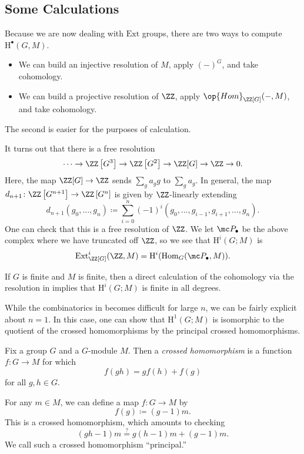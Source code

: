 \documentclass[../notes.tex]{subfiles}
\begin{document}
\subsection{Some Calculations}
Because we are now dealing with $\mathrm{Ext}$ groups, there are two ways to compute $\mathrm H^\bullet(G,M)$.
\begin{itemize}
	\item We can build an injective resolution of $M$, apply $(-)^G$, and take cohomology.
	\item We can build a projective resolution of $\ZZ$, apply $\op{Hom}_{\ZZ[G]}(-,M)$, and take cohomology.
\end{itemize}
The second is easier for the purposes of calculation.
\begin{example} \label{ex:compute-group-cohom}
	It turns out that there is a free resolution
	\[\cdots\to\ZZ\left[G^3\right]\to\ZZ\left[G^2\right]\to\ZZ[G]\to\ZZ\to0.\]
	Here, the map $\ZZ[G]\to\ZZ$ sends $\sum_ga_gg$ to $\sum_ga_g$. In general, the map $d_{n+1}\colon\ZZ\left[G^{n+1}\right]\to\ZZ\left[G^n\right]$ is given by $\ZZ$-linearly extending
	\[d_{n+1}(g_0,\ldots,g_n)\coloneqq\sum_{i=0}^n(-1)^i(g_0,\ldots,g_{i-1},g_{i+1},\ldots,g_n).\]
	One can check that this is a free resolution of $\ZZ$. We let $\mc P_\bullet$ be the above complex where we have truncated off $\ZZ$, so we see that $\mathrm H^i(G;M)$ is
	\[\mathrm{Ext}^i_{\ZZ[G]}(\ZZ,M)=\mathrm H^i(\mathrm{Hom}_G(\mc P_\bullet,M)).\]
\end{example}
\begin{remark}
	If $G$ is finite and $M$ is finite, then a direct calculation of the cohomology via the resolution in  implies that $\mathrm H^i(G;M)$ is finite in all degrees.
\end{remark}
While the combinatorics in  becomes difficult for large $n$, we can be fairly explicit about $n=1$. In this case, one can show that $\mathrm H^1(G;M)$ is isomorphic to the quotient of the crossed homomorphisms by the principal crossed homomorphisms.
\begin{definition}
	Fix a group $G$ and a $G$-module $M$. Then a \textit{crossed homomorphism} is a function $f\colon G\to M$ for which
	\[f(gh)=gf(h)+f(g)\]
	for all $g,h\in G$.
\end{definition}
\begin{example} 
	For any $m\in M$, we can define a map $f\colon G\to M$ by
	\[f(g)\coloneqq(g-1)m.\]
	This is a crossed homomorphism, which amounts to checking
	\[(gh-1)m\stackrel?=g(h-1)m+(g-1)m.\]
	We call such a crossed homomorphism ``principal.''
\end{example}
\end{document}
